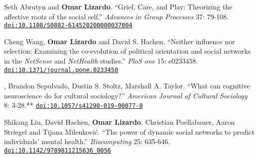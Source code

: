\ind Seth Abrutyn and {\bf Omar Lizardo}. ``Grief, Care, and Play: Theorizing the affective roots of the social self.'' {\em Advances in Group Processes} 37: 79-108.  \href{https://doi.org/10.1108/S0882-614520200000037004}{\nolinkurl{doi:10.1108/S0882-614520200000037004}}

\ind Cheng Wang, {\bf Omar Lizardo} and David S. Hachen. ``Neither influence nor selection: Examining the co-evolution of political orientation and social networks in the {\em NetSense} and {\em NetHealth} studies.'' {\em PloS one} 15: e0233458. \href{https://doi.org/10.1371/journal.pone.0233458}{\nolinkurl{doi:10.1371/journal.pone.0233458}}

, Brandon Sepulvado, Dustin S. Stoltz, Marshall A. Taylor. ``What can cognitive neuroscience do for cultural sociology?'' {\em American Journal of Cultural Sociology} 8: 3-28.\textcolor{uclablue}{**} \newline\href{https://doi.org/10.1057/s41290-019-00077-8}{\nolinkurl{doi:10.1057/s41290-019-00077-8}}

\ind Shikang Liu, David Hachen, {\bf Omar Lizardo}, Christian Poellabauer, Aaron Striegel and Tijana Milenkovi\'{c}. ``The power of dynamic social networks to predict individuals' mental health.'' {\em Biocomputing} 25: 635-646. \href{https://doi.org/10.1142/9789811215636_0056}{\nolinkurl{doi:10.1142/9789811215636_0056}}
